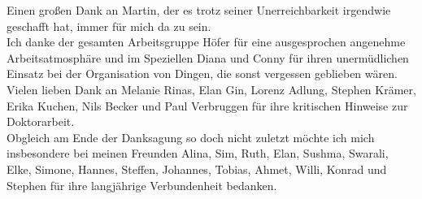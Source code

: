 Einen gro\ss{}en Dank an Martin, der es trotz seiner Unerreichbarkeit irgendwie geschafft hat, immer f\"{u}r mich da zu sein.\\

Ich danke der gesamten Arbeitsgruppe H\"{o}fer f\"{u}r eine ausgesprochen angenehme Arbeitsatmosph\"{a}re und im Speziellen Diana und Conny f\"ur ihren unerm\"{u}dlichen Einsatz bei der Organisation von Dingen, die sonst vergessen geblieben w\"{a}ren.\\

Vielen lieben Dank an Melanie Rinas, Elan Gin, Lorenz Adlung, Stephen Kr\"{a}mer, Erika Kuchen, Nils Becker und Paul Verbruggen f\"{u}r ihre kritischen Hinweise zur Doktorarbeit.  \\

\newpage
\thispagestyle{plain6}
Obgleich am Ende der Danksagung so doch nicht zuletzt m\"{o}chte ich mich insbesondere bei meinen Freunden Alina, Sim, Ruth, Elan, Sushma, Swarali, Elke, Simone, Hannes, Steffen, Johannes, Tobias, Ahmet, Willi, Konrad und Stephen f\"{u}r ihre langj\"{a}hrige Verbundenheit bedanken.  

  